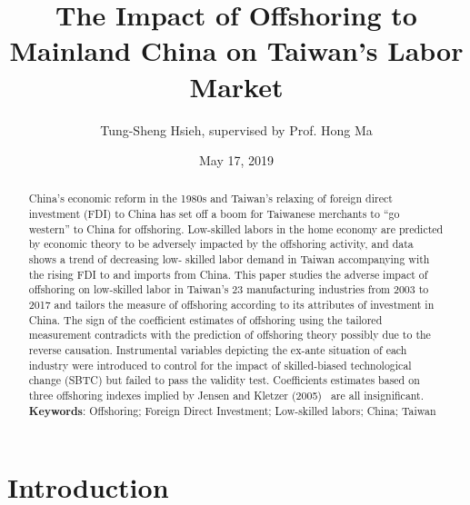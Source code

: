 \documentclass{article}
\title{The Impact of Offshoring to Mainland China on Taiwan’s Labor Market}
\author{Tung-Sheng Hsieh, supervised by Prof. Hong Ma}
\affil{SEM, Tsinghua University}
\date{May 17, 2019}
\begin{document}
\maketitle

\begin{abstract}
China’s economic reform in the 1980s and Taiwan’s relaxing of foreign direct investment (FDI) to China has set off a boom for Taiwanese merchants to “go western” to China for offshoring. Low-skilled labors in the home economy are predicted by economic theory to be adversely impacted by the offshoring activity, and data shows a trend of decreasing low- skilled labor demand in Taiwan accompanying with the rising FDI to and imports from China. This paper studies the adverse impact of offshoring on low-skilled labor in Taiwan’s 23 manufacturing industries from 2003 to 2017 and tailors the measure of offshoring according to its attributes of investment in China. The sign of the coefficient estimates of offshoring using the tailored measurement contradicts with the prediction of offshoring theory possibly due to the reverse causation. Instrumental variables depicting the ex-ante situation of each industry were introduced to control for the impact of skilled-biased technological change (SBTC) but failed to pass the validity test. Coefficients estimates based on three offshoring indexes implied by Jensen and Kletzer (2005) ~\cite{jensen2005tradable}are all insignificant.\\

\textbf{Keywords}: Offshoring; Foreign Direct Investment; Low-skilled labors; China; Taiwan

\end{abstract}

\section{Introduction}
\end{document}
